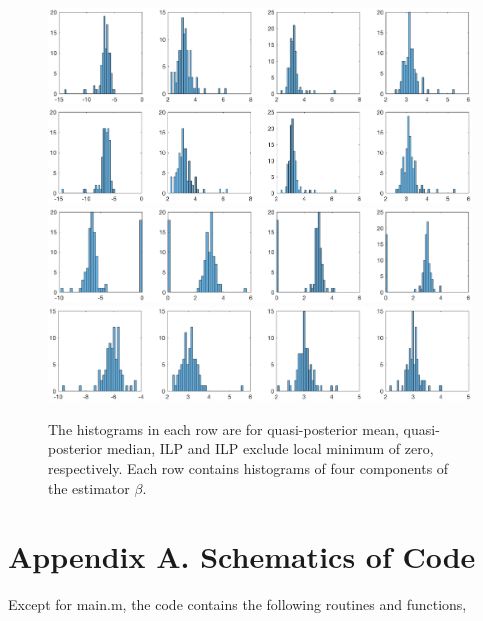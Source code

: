\documentclass[12pt]{article}
\theoremstyle{plain} \newtheorem{theorem}{Theorem}
\theoremstyle{definition} \newtheorem{definition}{Definition}
\begin{document}
\begin{figure}[h]
    \centering
    \includegraphics[width=1.2\textwidth]{figures/lte-mean.eps}
    \includegraphics[width=1.2\textwidth]{figures/lte-median.eps}
    \includegraphics[width=1.2\textwidth]{figures/ilp-allrep.eps}
    \includegraphics[width=1.2\textwidth]{figures/ilp-exzero.eps}
    \caption{The histograms in each row are for quasi-posterior mean,
      quasi-posterior median, ILP and ILP exclude local minimum of
      zero, respectively. Each row contains histograms of four
      components of the estimator $\beta$.}
    \label{fig:lte-mean}
\end{figure}


\clearpage

\nocite{*}  


\clearpage

\section*{Appendix A. Schematics of Code}
\label{sec:appendixa}
Except for main.m, the code contains the following routines and functions,
\end{document}
